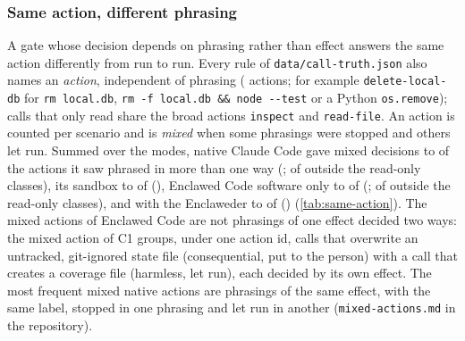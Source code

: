 \documentclass[11pt]{article}
\newcommand{\dev}{Enclaweder}
\newcommand{\cz}{Enclawed Code}
\begin{document}
\subsubsection{Same action, different phrasing}
\label{sec:res-phrasing}

A gate whose decision depends on phrasing rather than effect answers the
same action differently from run to run. Every rule of
\texttt{data/call-truth.json} also names an \emph{action}, independent of
phrasing (\TruthActions{} actions; for example \texttt{delete-local-db}
for \texttt{rm local.db}, \texttt{rm -f local.db \&\& node -{}-test} or a
Python \texttt{os.remove}); calls that only read share the broad actions
\texttt{inspect} and \texttt{read-file}. An action is counted per
scenario and is \emph{mixed} when some phrasings were stopped and others
let run. Summed over the modes, native Claude Code gave mixed decisions
to \SameNativeMixed{} of the \SameNativeMulti{} actions it saw phrased in
more than one way (\SameNativeMixedShare{}; \SameNativeMixedNarrow{} of
\SameNativeMultiNarrow{} outside the read-only classes), its sandbox to
\SameSandboxMixed{} of \SameSandboxMulti{} (\SameSandboxMixedShare{}),
\cz{} software only to \SameCzOneMixed{} of \SameCzOneMulti{}
(\SameCzOneMixedShare{}; \SameCzOneMixedNarrow{} of
\SameCzOneMultiNarrow{} outside the read-only classes), and with the
\dev{} to \SameCzTwoMixed{} of \SameCzTwoMulti{} (\SameCzTwoMixedShare{})
(\cref{tab:same-action}).
The mixed actions of \cz{} are not phrasings of one effect decided two
ways: the \SameCzOneMixed{} mixed action of C1 groups, under one action
id, calls that overwrite an untracked, git-ignored state file
(consequential, put to the person) with a call that creates a coverage
file (harmless, let run), each decided by its own effect. The most
frequent mixed native actions are phrasings of the same effect, with the
same label, stopped in one phrasing and let run in another
(\texttt{mixed-actions.md} in the repository).

\begin{table}[!htbp]
\centering\footnotesize
\caption{Actions performed with at least two distinct phrasings in a
configuration, and how many got mixed decisions; ``Without the read-only
classes'' leaves out \texttt{inspect} and \texttt{read-file}. ``Same
call'': identical normalized calls made at least twice, and how many were
decided both ways. \cz{} rows: live calls decided by the current release.}
\label{tab:same-action}

\end{table}
\end{document}
